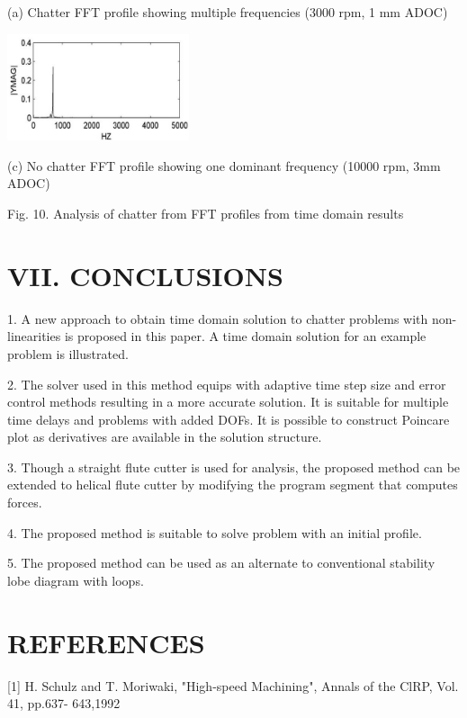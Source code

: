 \documentclass[10pt]{article}
\begin{document}
(a) Chatter FFT profile showing multiple frequencies (3000 rpm, 1 mm ADOC)

\begin{center}
\includegraphics[max width=0.4\textwidth]{images/01948e67-2b92-7dd1-b16f-a9746c8d80be_10_587_657_486_286_0.jpg}
\end{center}
\hspace*{3em} 

(c) No chatter FFT profile showing one dominant frequency (10000 rpm, 3mm ADOC)

Fig. 10. Analysis of chatter from FFT profiles from time domain results

\section*{VII. CONCLUSIONS}

1. A new approach to obtain time domain solution to chatter problems with non-linearities is proposed in this paper. A time domain solution for an example problem is illustrated.

2. The solver used in this method equips with adaptive time step size and error control methods resulting in a more accurate solution. It is suitable for multiple time delays and problems with added DOFs. It is possible to construct Poincare plot as derivatives are available in the solution structure.

3. Though a straight flute cutter is used for analysis, the proposed method can be extended to helical flute cutter by modifying the program segment that computes forces.

4. The proposed method is suitable to solve problem with an initial profile.

5. The proposed method can be used as an alternate to conventional stability lobe diagram with loops.

\section*{REFERENCES}

[1] H. Schulz and T. Moriwaki, "High-speed Machining", Annals of the ClRP, Vol. 41, pp.637- 643,1992
\end{document}
